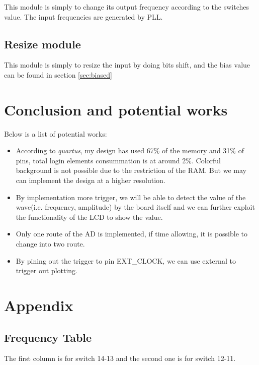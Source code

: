 \documentclass[11pt]{scrartcl}
\begin{document}
This module is simply to change its output frequency according to the switches value. The input frequencies are generated by PLL. 

\subsection{Resize module}

This module is simply to resize the input by doing bits shift, and the bias value can be found in section \ref{sec:biased}

\section{Conclusion and potential works}


Below is a list of potential works:
\begin{itemize}
\item According to \textit{quartus}, my design has used 67\% of the memory and 31\% of pins, total login elements consummation is at around 2\%. Colorful background is not possible due to the restriction of the RAM. But we may can implement the design at a higher resolution.\\


\item By implementation more trigger, we will be able to detect the value of the wave(i.e. frequency, amplitude) by the board itself and we can further exploit the functionality of the LCD to show the value.\\

\item Only one route of the AD is implemented, if time allowing, it is possible to change into two route.\\

\item By pining out the trigger to pin EXT\_CLOCK, we can use external to trigger out plotting.
\end{itemize}

 
\section{Appendix}

\subsection{Frequency Table}
\label{sec:fre}
The first column is for switch 14-13 and the second one is for switch 12-11.\\
\end{document}

